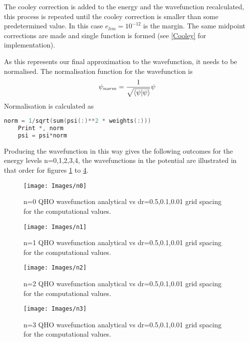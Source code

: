 \documentclass{article}
\begin{document}
    The cooley correction is added to the energy and the wavefunction recalculated, this process is repeated until the cooley correction is smaller than some predetermined value. In this case $e_{lim} = 10^{-12}$ is the margin. The same midpoint corrections are made and single function is formed (see \ref{Cooley} for implementation).
    
    As this represents our final approximation to the wavefunction, it needs to be normalised.
    The normalisation function for the wavefunction is 
    \large
    \begin{gather}
    	\psi_{norm} = \frac{1}{\sqrt{\bra{\psi}\ket{\psi}}}\psi
    \end{gather}
    \normalsize
    Normalisation is calculated as
    \begin{lstlisting}[language=C]
   	norm = 1/sqrt(sum(psi(:)**2 * weights(:)))
   	Print *, norm
   	psi = psi*norm
    \end{lstlisting}
    
    Producing the wavefunction in this way gives the following outcomes for the energy levels n=0,1,2,3,4, the wavefunctions in the potential are illustrated in that order for figures \ref{n0} to \ref{n3}.
    
    \begin{figure}[H]
    	\centering
    	\texttt{[image: Images/n0]}
    	\caption{n=0 QHO wavefunction analytical vs dr=0.5,0.1,0.01 grid spacing for the computational values.}
    	\label{n0}
    \end{figure}
    
    \begin{figure}[H]
    	\centering
    	\texttt{[image: Images/n1]}
    	\caption{n=1 QHO wavefunction analytical vs dr=0.5,0.1,0.01 grid spacing for the computational values.}
    	\label{n1}
    \end{figure}
    
    \begin{figure}[H]
    	\centering
    	\texttt{[image: Images/n2]}
    	\caption{n=2 QHO wavefunction analytical vs dr=0.5,0.1,0.01 grid spacing for the computational values.}
    	\label{n2}
    \end{figure}
    
    \begin{figure}[H]
    	\centering
    	\texttt{[image: Images/n3]}
    	\caption{n=3 QHO wavefunction analytical vs dr=0.5,0.1,0.01 grid spacing for the computational values.}
    	\label{n3}
    \end{figure}
    
\end{document}

